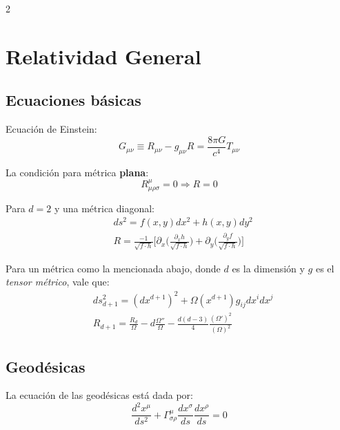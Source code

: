 \documentclass[12pt]{article}
\date{}
\begin{document}
    \begin{multicols}{2}
        \section*{Relatividad General}
        \subsection*{Ecuaciones básicas}
        Ecuación de Einstein:
        \begin{equation*}
            G_{\mu\nu} \equiv R_{\mu\nu} - g_{\mu\nu}R = \frac{8 \pi G}{c^4}T_{\mu\nu}
        \end{equation*}

        La condición para métrica \textbf{plana}:
        \begin{equation*}
            R^{\mu}_{\mu\rho\sigma} = 0 \Rightarrow R = 0
        \end{equation*}

        Para $d=2$ y una métrica diagonal:
        \begin{equation*}
            \begin{aligned}
                &ds^2 = f(x,y)dx^2 + h(x, y)dy^2 \\
                &R = \frac{-1}{\sqrt{f\cdot h}}\bigg[ \partial_x \bigg( \frac{\partial_x h}{\sqrt{f\cdot h}}\bigg) + \partial_y \bigg( \frac{\partial_yf}{\sqrt{f \cdot h}} \bigg)\bigg]
            \end{aligned}
        \end{equation*}

        Para un métrica como la mencionada abajo, donde $d$ es la dimensión y $g$ es el \textit{tensor métrico}, vale que:
        \begin{equation*}
            \begin{aligned}
            &ds^{2}_{d+1} = (dx^{d+1})^2 + \Omega(x^{d+1})g_{ij}dx^idx^j \\
            &R_{d+1} = \frac{R_d}{\Omega} -d\frac{\Omega''}{\Omega} - \frac{d(d-3)}{4}\frac{(\Omega')^2}{(\Omega)^2}
            \end{aligned}
        \end{equation*}

        \subsection*{Geodésicas}
        La ecuación de las geodésicas está dada por:
        \begin{equation*}
            \frac{d^2x^\mu}{ds^2} + \Gamma^{\mu}_{\sigma\rho} \frac{dx^{\sigma}}{ds} \frac{dx^{\rho}}{ds} = 0
        \end{equation*}


\end{multicols}
\end{document}
